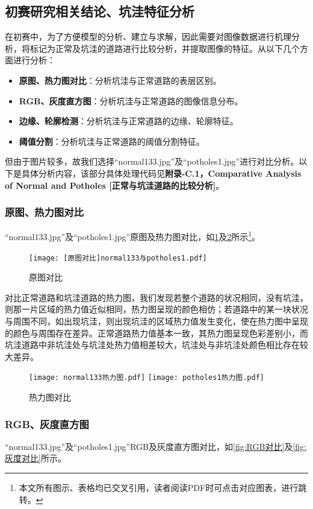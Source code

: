 \documentclass{MathorCupmodeling}
\begin{document}
	\subsection{初赛研究相关结论、坑洼特征分析}\label{分析}
	在初赛中，为了方便模型的分析、建立与求解，因此需要对图像数据进行机理分析，将标记为正常及坑洼的道路进行比较分析，并提取图像的特征。从以下几个方面进行分析：
	\begin{itemize}
		\item \textbf{原图、热力图对比}：分析坑洼与正常道路的表层区别。
		\item \textbf{RGB、灰度直方图}：分析坑洼与正常道路的图像信息分布。
		\item \textbf{边缘、轮廓检测}：分析坑洼与正常道路的边缘、轮廓特征。
		\item \textbf{阈值分割}：分析坑洼与正常道路的阈值分割特征。
	\end{itemize}
	
	但由于图片较多，故我们选择“normal133.jpg”及“potholes1.jpg”进行对比分析。以下是具体分析内容，该部分具体处理代码见\textbf{附录-C.1，Comparative Analysis of Normal and Potholes [正常与坑洼道路的比较分析]}。
	\subsubsection{原图、热力图对比}
	“normal133.jpg”及“potholes1.jpg”原图及热力图对比，如\textcolor{blue}{\cref{fig:原图对比}}及\textcolor{blue}{\cref{fig:热力图对比}}所示\textcolor{blue}{\footnote{本文所有图示、表格均已交叉引用，读者阅读PDF时可点击对应图表，进行跳转。}}。
	\begin{figure}[H]
		\centering
			\centering
			\texttt{[image: [原图对比]normal133与potholes1.pdf]}
			\caption{原图对比}
			\label{fig:原图对比}
	\end{figure}
	
	对比正常道路和坑洼道路的热力图，我们发现若整个道路的状况相同，没有坑洼，则那一片区域的热力值近似相同，热力图呈现的颜色相仿；若道路中的某一块状况与周围不同，如出现坑洼，则出现坑洼的区域热力值发生变化，使在热力图中呈现的颜色与周围存在差异。正常道路热力值基本一致，其热力图呈现色彩差别小，而坑洼道路中非坑洼处与坑洼处热力值相差较大，坑洼处与非坑洼处颜色相比存在较大差异。
	\begin{figure}[H]
		\centering
		\texttt{[image: normal133热力图.pdf]}
		\hspace{0.3in}
		\texttt{[image: potholes1热力图.pdf]}
		\caption{热力图对比}
		\label{fig:热力图对比}
	\end{figure}

	\subsubsection{RGB、灰度直方图}
	“normal133.jpg”及“potholes1.jpg”RGB及灰度直方图对比，如\textcolor{blue}{\cref{fig:RGB对比}}及\textcolor{blue}{\cref{fig:灰度对比}}所示。
	
\end{document}
